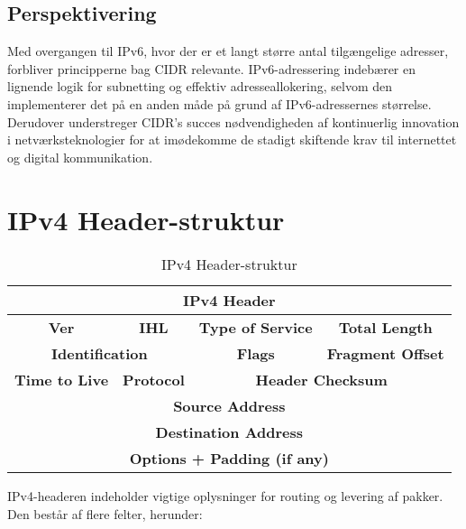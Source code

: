 \subsection{Perspektivering}
Med overgangen til IPv6, hvor der er et langt større antal tilgængelige adresser, forbliver principperne bag CIDR relevante. IPv6-adressering indebærer en lignende logik for subnetting og effektiv adresseallokering, selvom den implementerer det på en anden måde på grund af IPv6-adressernes størrelse. Derudover understreger CIDR's succes nødvendigheden af kontinuerlig innovation i netværksteknologier for at imødekomme de stadigt skiftende krav til internettet og digital kommunikation.

\section{IPv4 Header-struktur}
\begin{table}[h]
	\centering
	\begin{tabular}{|c|c|c|c|}
		\hline
		\multicolumn{4}{|c|}{\textbf{IPv4 Header}} \\ \hline
		\textbf{Ver} & \textbf{IHL} & \textbf{Type of Service} & \textbf{Total Length} \\ \hline
		\multicolumn{2}{|c|}{\textbf{Identification}} & \textbf{Flags} & \textbf{Fragment Offset} \\ \hline
		\textbf{Time to Live} & \textbf{Protocol} & \multicolumn{2}{c|}{\textbf{Header Checksum}} \\ \hline
		\multicolumn{4}{|c|}{\textbf{Source Address}} \\ \hline
		\multicolumn{4}{|c|}{\textbf{Destination Address}} \\ \hline
		\multicolumn{4}{|c|}{\textbf{Options + Padding (if any)}} \\ \hline
	\end{tabular}
	\caption{IPv4 Header-struktur}
	\label{tab:ipv4-header}
\end{table}

\noindent IPv4-headeren indeholder vigtige oplysninger for routing og levering af pakker. Den består af flere felter, herunder:

